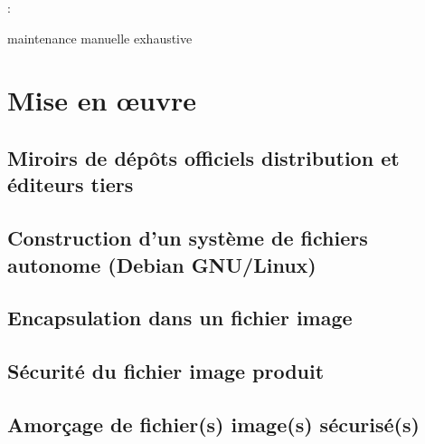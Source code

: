 \documentclass[12pt]{report}
\begin{document}
:
\begin{itmz}
\item{\ml{}
{maintenance manuelle exhaustive}}
\end{itmz}

\ml
{\section{\todo}}
{\section{Mise en œuvre}}

\ml
{\subsection{\todo}}
{\subsection{Miroirs de dépôts officiels distribution et éditeurs tiers}}

\ml
{\subsection{\todo}}
{\subsection{Construction d’un système de fichiers autonome (Debian GNU/Linux)}}

\ml
{\subsection{\todo}}
{\subsection{Encapsulation dans un fichier image}}

\ml
{\subsection{\todo}}
{\subsection{Sécurité du fichier image produit}}

\ml
{\subsection{\todo}}
{\subsection{Amorçage de fichier(s) image(s) sécurisé(s)}}
\end{document}
